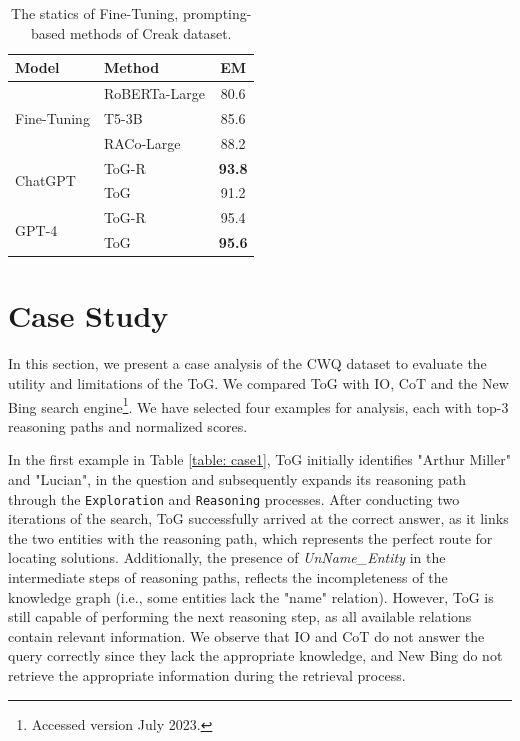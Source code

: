\documentclass{article} %
\begin{document}
\begin{table}[]
\centering
\begin{tabular}{llc}
\hline
       \textbf{Model}    & \textbf{Method} &  \textbf{EM} \\ \hline
\multirow{3}{*}{Fine-Tuning}     	&   RoBERTa-Large	 \citep{liu2019roberta}         & 80.6	  	\\
                                 &  	T5-3B	 \citep{raffel2020exploring}                    & 85.6	\\
                                 &  RACo-Large		 \citep{creak1}    &    88.2		 \\\hline
\multirow{2}{*}{ChatGPT}          &  ToG-R                     &  \textbf{93.8}  \\
                                 &  ToG                 & 91.2   \\ \hline
\multirow{2}{*}{GPT-4}          &  ToG-R                     &  95.4  \\
                                 &  ToG                 & \textbf{95.6}   \\ \hline
\end{tabular}

\caption{The statics of Fine-Tuning, prompting-based methods of Creak dataset.}
\label{tab: creak}
\end{table}

\newpage

\section{Case Study}
\label{sec: case_study}
In this section, we present a case analysis of the CWQ dataset to evaluate the utility and limitations of the ToG. We compared ToG with IO, CoT and the New Bing search engine\footnote{Accessed version July 2023.}. We have selected four examples for analysis, each with top-3 reasoning paths and normalized scores. 

In the first example in Table \ref{table: case1}, ToG initially identifies "Arthur Miller" and "Lucian", in the question and subsequently expands its reasoning path through the \texttt{Exploration} and \texttt{Reasoning} processes. After conducting two iterations of the search, ToG successfully arrived at the correct answer, as it links the two entities with the reasoning path, which represents the perfect route for locating solutions. Additionally, the presence of \textsl{UnName\_Entity} in the intermediate steps of reasoning paths, reflects the incompleteness of the knowledge graph (i.e., some entities lack the "name" relation). However, ToG is still capable of performing the next reasoning step, as all available relations contain relevant information. We observe that IO and CoT do not answer the query correctly since they lack the appropriate knowledge, and New Bing do not retrieve the appropriate information during the retrieval process.
\end{document}
